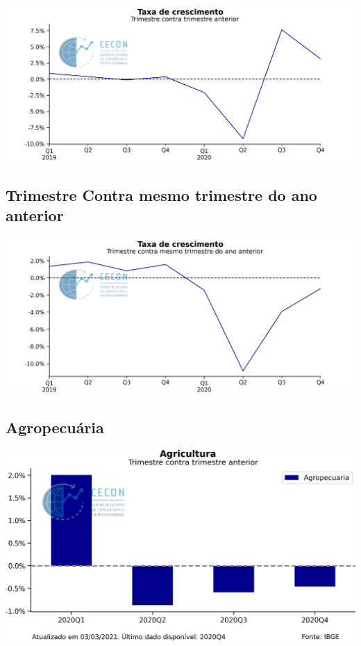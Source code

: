 \documentclass{SelfArx}
\begin{document}
\begin{center}
\includegraphics[width=.9\linewidth]{./figs/PIB/PIB.png}
\end{center}

\subsection*{Trimestre Contra mesmo trimestre do ano anterior}
\label{sec:orgc4a835b}

\begin{center}
\includegraphics[width=.9\linewidth]{./figs/PIB/PIB_YoY.png}
\end{center}

\subsection*{Agropecuária}
\label{sec:org4bb26c1}

\begin{center}
\includegraphics[width=.9\linewidth]{./figs/PIB/Agropecuaria.png}
\end{center}
\end{document}
